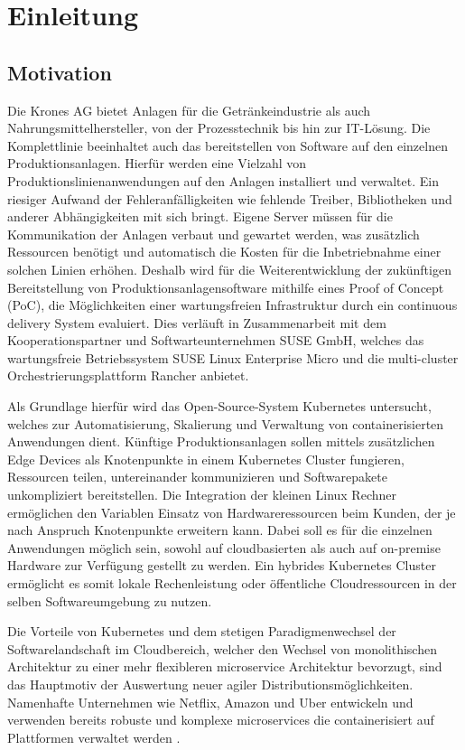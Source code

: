 \chapter{Einleitung}
\section{Motivation}
Die Krones AG bietet Anlagen für die Getränkeindustrie als auch 
Nahrungsmittelhersteller, von der Prozesstechnik bis hin zur IT-Lösung. 
Die Komplettlinie beeinhaltet auch das bereitstellen von Software auf den einzelnen Produktionsanlagen. 
Hierfür werden eine Vielzahl von Produktionslinienanwendungen auf den Anlagen installiert und verwaltet.
Ein riesiger Aufwand der Fehleranfälligkeiten wie fehlende Treiber, Bibliotheken
und anderer Abhängigkeiten mit sich bringt.
Eigene Server müssen für die Kommunikation der Anlagen verbaut und gewartet werden,
was zusätzlich Ressourcen benötigt und automatisch die Kosten für die Inbetriebnahme einer solchen
Linien erhöhen.
Deshalb wird für die Weiterentwicklung der zukünftigen Bereitstellung von Produktionsanlagensoftware
mithilfe eines Proof of Concept (PoC), die Möglichkeiten einer wartungsfreien Infrastruktur
durch ein continuous delivery System evaluiert. Dies verläuft in Zusammenarbeit mit dem
Kooperationspartner und Softwarteunternehmen SUSE GmbH, welches das wartungsfreie Betriebssystem
SUSE Linux Enterprise Micro und die multi-cluster Orchestrierungsplattform Rancher anbietet.

Als Grundlage hierfür wird das Open-Source-System Kubernetes untersucht, welches zur Automatisierung, Skalierung
und Verwaltung von containerisierten Anwendungen dient. Künftige Produktionsanlagen sollen mittels zusätzlichen Edge Devices
als Knotenpunkte in einem Kubernetes Cluster fungieren, Ressourcen teilen, untereinander kommunizieren und Softwarepakete unkompliziert bereitstellen.
Die Integration der kleinen Linux Rechner ermöglichen den Variablen Einsatz von Hardwareressourcen beim Kunden, der je nach Anspruch Knotenpunkte erweitern kann.
Dabei soll es für die einzelnen Anwendungen möglich sein, sowohl auf cloudbasierten als auch auf on-premise Hardware zur Verfügung gestellt zu werden.
Ein hybrides Kubernetes Cluster ermöglicht es somit lokale Rechenleistung oder öffentliche Cloudressourcen in der selben Softwareumgebung zu nutzen.

Die Vorteile von Kubernetes und dem stetigen Paradigmenwechsel der Softwarelandschaft im Cloudbereich, welcher
den Wechsel von monolithischen Architektur zu einer mehr flexibleren microservice Architektur
bevorzugt, sind das Hauptmotiv der Auswertung neuer agiler Distributionsmöglichkeiten.
Namenhafte Unternehmen wie Netflix, Amazon und Uber entwickeln und verwenden
bereits robuste und komplexe microservices die containerisiert auf Plattformen
verwaltet werden \cite{microservice}. 

